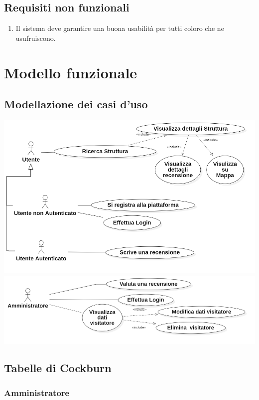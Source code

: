 \section{Requisiti non funzionali}
\begin{enumerate}
    \item Il sistema deve garantire una buona usabilità per tutti coloro che ne usufruiscono.
\end{enumerate}
\chapter{Modello funzionale}

\section{Modellazione dei casi d'uso}

\includegraphics[scale=0.4]{Usecase/ucd2.png}
\includegraphics[scale=0.4]{Usecase/ucd1.png}


\section{Tabelle di Cockburn}
\subsection{Amministratore}


\pagebreak



\pagebreak

